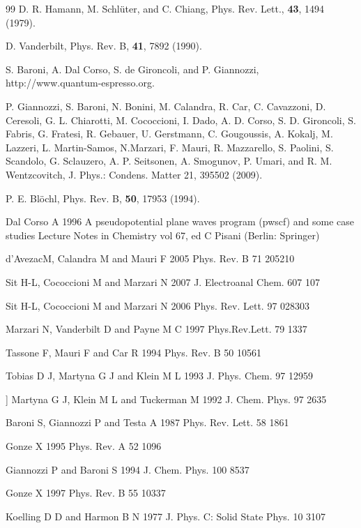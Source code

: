 {\begin{thebibliography} {99}
D. R. Hamann, M. Schl\"{u}ter, and C. Chiang,
Phys. Rev. Lett., {\bf 43}, 1494 (1979).

D. Vanderbilt,
Phys. Rev. B, {\bf 41}, 7892 (1990).

S. Baroni, A. Dal Corso, S. de Gironcoli, and P. Giannozzi,
http://www.quantum-espresso.org.


P. Giannozzi, S. Baroni, N. Bonini, M. Calandra, R. Car, C. Cavazzoni, D. Ceresoli, G. L. Chiarotti, M. Cococcioni, I. Dado, A. D. Corso, S. D. Gironcoli, S. Fabris, G. Fratesi, R. Gebauer, U. Gerstmann, C. Gougoussis, A. Kokalj, M. Lazzeri, L. Martin-Samos, N.Marzari, F. Mauri, R. Mazzarello, S. Paolini, S. Scandolo, G. Sclauzero, A. P. Seitsonen, A. Smogunov, P. Umari, and R. M. Wentzcovitch, J. Phys.: Condens. Matter 21, 395502 (2009).

P. E. Bl\"{o}chl,
Phys. Rev. B, {\bf 50}, 17953 (1994). 

Dal Corso A 1996 A pseudopotential plane waves program
(pwscf) and some case studies Lecture Notes in Chemistry
vol 67, ed C Pisani (Berlin: Springer)


d’AvezacM, Calandra M and Mauri F 2005 Phys. Rev. B
71 205210

Sit H-L, Cococcioni M and Marzari N 2007 J. Electroanal
Chem. 607 107

Sit H-L, Cococcioni M and Marzari N 2006 Phys. Rev. Lett.
97 028303

 Marzari N, Vanderbilt D and Payne M C 1997 Phys.Rev.Lett.
79 1337

 Tassone F, Mauri F and Car R 1994 Phys. Rev. B 50 10561

 Tobias D J, Martyna G J and Klein M L 1993 J. Phys. Chem.
97 12959

] Martyna G J, Klein M L and Tuckerman M 1992 J. Chem.
Phys. 97 2635

Baroni S, Giannozzi P and Testa A 1987 Phys. Rev. Lett.
58 1861

 Gonze X 1995 Phys. Rev. A 52 1096

Giannozzi P and Baroni S 1994 J. Chem. Phys. 100 8537

Gonze X 1997 Phys. Rev. B 55 10337

Koelling D D and Harmon B N 1977 J. Phys. C: Solid State
Phys. 10 3107


\end{thebibliography}}
